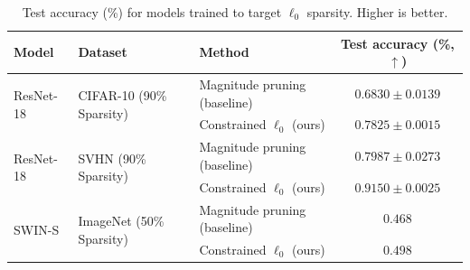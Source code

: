 \begin{table}[t]
\caption{Test accuracy (\%) for models trained to target $\ell_0$ sparsity. Higher is better.}
\vspace{-3mm}
\begin{center}
\small
\label{tab:l0_sparsity_results}
\begin{tabular}{l l l c}
\toprule
Model & Dataset & Method & Test accuracy (\%, $\uparrow$) \\
\midrule
\multirow{2}{*}{ResNet-18} & \multirow{2}{*}{CIFAR-10 (90\% Sparsity)} & Magnitude pruning (baseline) & $0.6830 \pm 0.0139$ \\
& & Constrained $\ell_0$ (ours) & $\mathbf{0.7825 \pm 0.0015}$ \\
\midrule
\multirow{2}{*}{ResNet-18} & \multirow{2}{*}{SVHN (90\% Sparsity)} & Magnitude pruning (baseline) & $0.7987 \pm 0.0273$ \\
& & Constrained $\ell_0$ (ours) & $\mathbf{0.9150 \pm 0.0025}$ \\
\midrule

\multirow{2}{*}{SWIN-S} & \multirow{2}{*}{ImageNet (50\% Sparsity)} & Magnitude pruning (baseline) & $0.468$ \\
& & Constrained $\ell_0$ (ours) & $\mathbf{0.498}$ \\
\bottomrule
\end{tabular}

\end{center}
\end{table}


